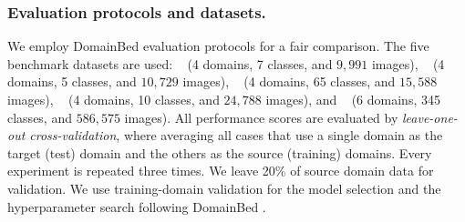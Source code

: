 \subsubsection{Evaluation protocols and datasets.} 
We employ DomainBed evaluation protocols \cite{gulrajani2020domainbed, cha2021swad} for a fair comparison. The five benchmark datasets are used: ~\cite{li2017pacs} (4 domains, 7 classes, and $9,991$ images), ~\cite{fang2013vlcs} (4 domains, 5 classes, and $10,729$ images), ~\cite{venkateswara2017officehome} (4 domains, 65 classes, and $15,588$ images), ~\cite{beery2018terraincognita} (4 domains, 10 classes, and $24,788$ images), and ~\cite{peng2019domainnet} (6 domains, 345 classes, and $586,575$ images).
All performance scores are evaluated by \textit{leave-one-out cross-validation}, where averaging all cases that use a single domain as the target (test) domain and the others as the source (training) domains. Every experiment is repeated three times. We leave 20\% of source domain data for validation. We use training-domain validation for the model selection and the hyperparameter search following DomainBed \cite{gulrajani2020domainbed}.

